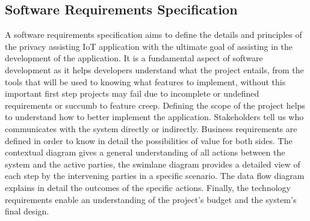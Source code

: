 

\subsection{Software Requirements Specification}
\label{subsection:software_requirements}

A software requirements specification aims to define the details and principles
of the privacy assisting
IoT application with the ultimate goal of assisting in the development
of the application. It is a fundamental aspect of software development as it
helps developers understand what the project entails, from the tools that will be
used to knowing what features to implement, without this important first step projects
may fail due to incomplete or undefined requirements or succumb to feature creep.
Defining the scope of the project helps to understand
how to better implement the application.
Stakeholders tell us who communicates
with the system directly or indirectly. Business requirements are
defined in order to know in detail the possibilities of value for both sides.
The contextual diagram gives a general understanding of all actions between the
system and the active parties, the swimlane diagram provides a detailed
view of each step by the intervening parties in a specific scenario. The data
flow diagram explains in detail the outcomes of the specific actions. Finally,
the technology requirements enable an understanding of the project's budget and
the system's final design.

